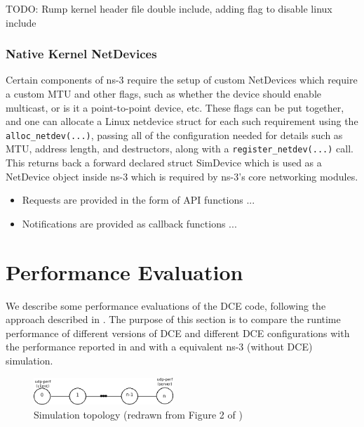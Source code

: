 \documentclass{sig-alternate}
\begin{document}
TODO: Rump kernel header file double include, adding flag to disable linux include

\subsubsection{Native Kernel NetDevices}
Certain components of ns-3 require the setup of custom NetDevices which require a custom MTU and other flags, such as whether the device should enable multicast, 
or is it a point-to-point device, etc. These flags can be put together, and one can allocate a Linux netdevice struct for each such requirement using
the \texttt{alloc\_netdev(...)}, passing all of the configuration needed for details such as MTU, address length, and destructors, along with a \texttt{register\_netdev(...)} call.
This returns back a forward declared struct SimDevice which is used as a NetDevice object inside ns-3 which is required by ns-3's core networking modules.

\begin{itemize}
 \item Requests are provided in the form of API functions ...
 \item Notifications are provided as callback functions ...
\end{itemize}

\section{Performance Evaluation}
We describe some performance evaluations of the DCE code, following the
approach described in \cite{Tazaki13}.  The purpose of this section is to
compare the runtime performance of different versions of DCE and different
DCE configurations with the performance reported in \cite{Tazaki13} and with
a equivalent ns-3 (without DCE) simulation.

\begin{figure}[h!]
  \centering
    \includegraphics[width=0.47\textwidth]{figs/topology.png}
  \caption{Simulation topology (redrawn from Figure 2 of \cite{Tazaki13})}
  \label{fig:topology}
\end{figure}
\end{document}
